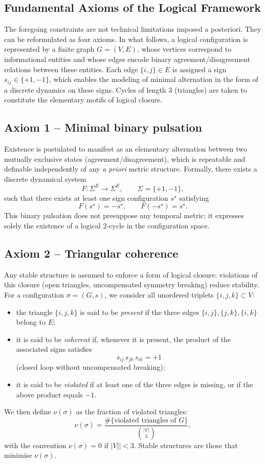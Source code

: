 \documentclass[11pt,a4paper]{article}
\begin{document}
\subsection*{Fundamental Axioms of the Logical Framework}
The foregoing constraints are not technical limitations imposed a posteriori. They can be reformulated as four axioms. In what follows, a logical configuration is represented by a finite graph \(G = (V, E)\), whose vertices correspond to informational entities and whose edges encode binary agreement/disagreement relations between these entities. Each edge \(\{i,j\} \in E\) is assigned a sign \(s_{ij} \in \{+1,-1\}\), which enables the modeling of minimal alternation in the form of a discrete dynamics on these signs. Cycles of length 3 (triangles) are taken to constitute the elementary motifs of logical closure.

\subsection*{Axiom 1 – Minimal binary pulsation}
Existence is postulated to manifest as an elementary alternation between two mutually exclusive states (agreement/disagreement), which is repeatable and definable independently of any \emph{a priori} metric structure. Formally, there exists a discrete dynamical system
\[
F : \Sigma^E \rightarrow \Sigma^E, \qquad \Sigma = \{+1,-1\},
\]
such that there exists at least one sign configuration \(s^\star\) satisfying
\[
F(s^\star) = -s^\star, \qquad F(-s^\star) = s^\star.
\]
This binary pulsation does not presuppose any temporal metric; it expresses solely the existence of a logical 2-cycle in the configuration space.

\subsection*{Axiom 2 – Triangular coherence}
Any stable structure is assumed to enforce a form of logical closure: violations of this closure (open triangles, uncompensated symmetry breaking) reduce stability. For a configuration \(\sigma = (G,s)\), we consider all unordered triplets \(\{i,j,k\} \subset V\):
\begin{itemize}[label=-]
  \item the triangle \(\{i,j,k\}\) is said to be \emph{present} if the three edges \(\{i,j\}, \{j,k\}, \{i,k\}\) belong to \(E\);
  \item it is said to be \emph{coherent} if, whenever it is present, the product of the associated signs satisfies
  \[
  s_{ij}\, s_{jk}\, s_{ik} = +1
  \]
  (closed loop without uncompensated breaking);
  \item it is said to be \emph{violated} if at least one of the three edges is missing, or if the above product equals \(-1\).
\end{itemize}
We then define \(\nu(\sigma)\) as the fraction of violated triangles:
\[
\nu(\sigma) = \frac{\#\{\text{violated triangles of } G\}}{\binom{|V|}{3}},
\]
with the convention \(\nu(\sigma) = 0\) if \(|V|| < 3\). Stable structures are those that minimise \(\nu(\sigma)\).
\end{document}
